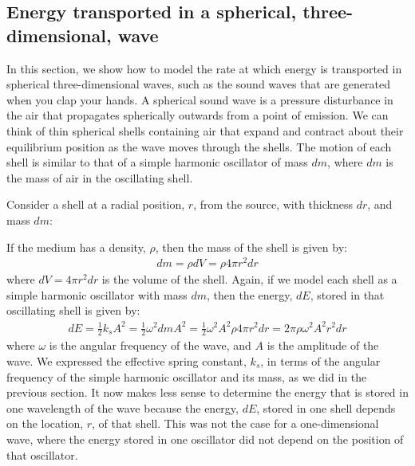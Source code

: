 \subsection{Energy transported in a spherical, three-dimensional, wave}
In this section, we show how to model the rate at which energy is transported in spherical three-dimensional waves, such as the sound waves that are generated when you clap your hands. A spherical sound wave is a pressure disturbance in the air that propagates spherically outwards from a point of emission. We can think of thin spherical shells containing air that expand and contract about their equilibrium position as the wave moves through the shells. The motion of each shell is similar to that of a simple harmonic oscillator of mass $dm$, where $dm$ is the mass of air in the oscillating shell.


Consider a shell at a radial position, $r$, from the source, with thickness $dr$, and mass $dm$:

 If the medium has a density, $\rho$, then the mass of the shell is given by:
\begin{align*}
dm = \rho dV = \rho 4\pi r^2 dr
\end{align*}
where $dV = 4\pi r^2 dr$ is the volume of the shell. Again, if we model each shell as a simple harmonic oscillator with mass $dm$, then the energy, $dE$, stored in that oscillating shell is given by:
\begin{align*}
dE = \frac{1}{2}k_s A^2 =  \frac{1}{2}\omega^2 dm A^2 = \frac{1}{2}\omega^2 A^2 \rho 4\pi r^2 dr=2\pi\rho  \omega^2 A^2  r^2 dr
\end{align*}
where $\omega$ is the angular frequency of the wave, and $A$ is the amplitude of the wave. We expressed the effective spring constant, $k_s$, in terms of the angular frequency of the simple harmonic oscillator and its mass, as we did in the previous section. It now makes less sense to determine the energy that is stored in one wavelength of the wave because the energy, $dE$, stored in one shell depends on the location, $r$, of that shell. This was not the case for a one-dimensional wave, where the energy stored in one oscillator did not depend on the position of that oscillator.

